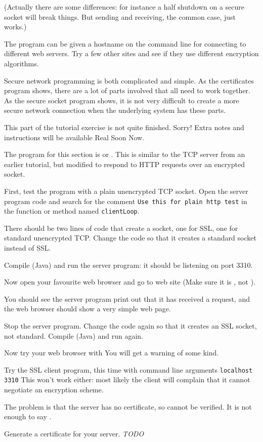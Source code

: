 (Actually there are some differences: for instance a half shutdown on a secure
socket will break things. But sending and receiving, the common case, just works.)

The program can be given a hostname on the command line for connecting to
different web servers. Try a few other sites and see if they use different
encryption algorithms.

Secure network programming is both complicated and simple. As the certificates
program shows, there are a lot of parts involved that all need to work together.
As the secure socket program shows, it is not very difficult to create a more
secure network connection when the underlying system has these parts.



\begin{IMPORTANT}
This part of the tutorial exercise is not quite finished. Sorry! Extra notes
and instructions will be available Real Soon Now.
\end{IMPORTANT}

\STEP The program for this section is  or .
This is similar to the TCP server from an earlier tutorial, but modified to
respond to HTTP requests over an encrypted socket.

\STEP First, test the program with a plain unencrypted TCP socket. Open the server
program code and search for the comment \texttt{Use this for plain http test}
in the function or method named \texttt{clientLoop}.

There should be two lines of code that create a socket, one for SSL, one for
standard unencrypted TCP. Change the code so that it creates a standard socket
instead of SSL.

Compile (Java) and run the server program: it should be listening on port 3310.

Now open your favourite web browser and go to web site
(Make sure it is , not ).

You should see the server program print out that it has received a request, and
the web browser should show a very simple web page.

\STEP Stop the server program. Change the code again so that it creates an SSL
socket, not standard. Compile (Java) and run again.

Now try your web browser with
You will get a warning of some kind.

Try the SSL client program, this time with command line arguments
\texttt{localhost 3310}
This won't work either: most likely the client will complain that it cannot
negotiate an encryption scheme.

The problem is that the server has no certificate, so cannot be verified.
It is not enough to say .

\STEP Generate a certificate for your server. \emph{TODO}


\COPYRIGHT


